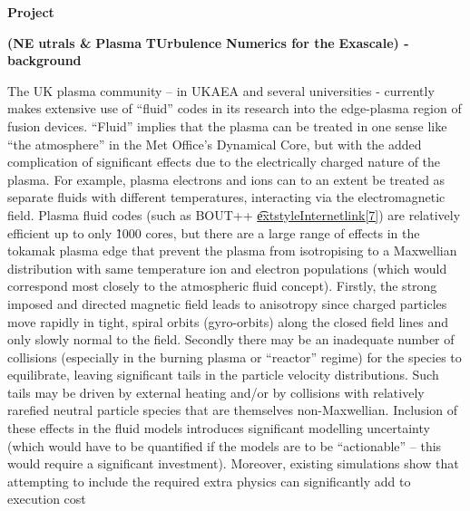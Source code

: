 \documentclass[a4paper]{article}
\begin{document}
\bigskip

\textbf{\textcolor[rgb]{0.12156863,0.28627452,0.49019608}{Project \nep \ }}

\textbf{(}\textbf{\textcolor[rgb]{0.12156863,0.28627452,0.49019608}{NE}}\textbf{
utrals \&
}\textbf{\textcolor[rgb]{0.12156863,0.28627452,0.49019608}{P}}\textbf{lasma
}\textbf{\textcolor[rgb]{0.12156863,0.28627452,0.49019608}{TU}}\textbf{rbulence
}\textbf{\textcolor[rgb]{0.12156863,0.28627452,0.49019608}{N}}\textbf{umerics 
for the
}\textbf{\textcolor[rgb]{0.12156863,0.28627452,0.49019608}{E}}\textbf{xascale) 
- background}


\bigskip

The UK plasma community -- in UKAEA and several universities - currently makes 
extensive use of ``fluid'' codes in its
research into the edge-plasma region of fusion devices. ``Fluid'' implies that 
the plasma can be treated in one sense
like ``the atmosphere'' in the Met Office's Dynamical Core, but with the added 
complication of significant effects due
to the electrically charged nature of the plasma. For example, plasma electrons 
and ions can to an extent be treated as
separate fluids with different temperatures, interacting via the 
electromagnetic field. Plasma fluid codes (such as
{BOUT++
}\href{https://bout-dev.readthedocs.io/en/latest/user_docs/introduction.html}{\t
extstyleInternetlink{{[7]}}}{)
are relatively }efficient up to only \~1000 cores, but there are a large 
range of effects in the tokamak plasma edge
that prevent the plasma from isotropising to a Maxwellian distribution with 
same temperature ion and electron
populations (which would correspond most closely to the atmospheric fluid 
concept). Firstly, the strong imposed and
directed magnetic field leads to anisotropy since charged particles move 
rapidly in tight, spiral orbits (gyro-orbits)
along the closed field lines and only slowly normal to the field. Secondly 
there may be an inadequate number of
collisions (especially in the burning plasma or ``reactor'' regime) for the 
species to equilibrate, leaving significant
tails in the particle velocity distributions. Such tails may be driven by 
external heating and/or by collisions with
relatively rarefied neutral particle species that are themselves 
non-Maxwellian. Inclusion of these effects in the
fluid models introduces significant modelling uncertainty (which would have to 
be quantified if the models are to be
``actionable'' -- this would require a significant investment). Moreover, 
existing simulations show that attempting to
include the required extra physics can significantly add to execution cost 
\end{document}
